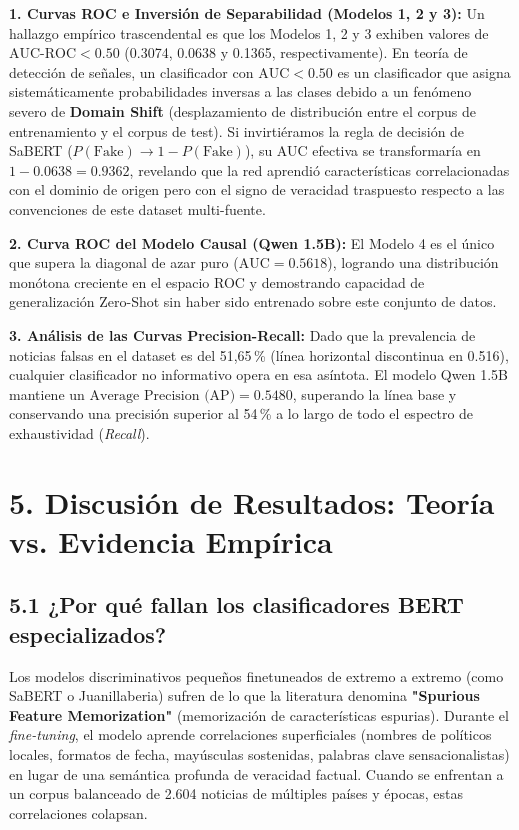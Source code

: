 \textbf{1. Curvas ROC e Inversión de Separabilidad (Modelos 1, 2 y 3):}
Un hallazgo empírico trascendental es que los Modelos 1, 2 y 3 exhiben valores de $\text{AUC-ROC} < 0.50$ (0.3074, 0.0638 y 0.1365, respectivamente). En teoría de detección de señales, un clasificador con $\text{AUC} < 0.50$ es un clasificador que asigna sistemáticamente probabilidades inversas a las clases debido a un fenómeno severo de \textbf{Domain Shift} (desplazamiento de distribución entre el corpus de entrenamiento y el corpus de test). Si invirtiéramos la regla de decisión de SaBERT ($P(\text{Fake}) \to 1 - P(\text{Fake})$), su AUC efectiva se transformaría en $1 - 0.0638 = 0.9362$, revelando que la red aprendió características correlacionadas con el dominio de origen pero con el signo de veracidad traspuesto respecto a las convenciones de este dataset multi-fuente.

\textbf{2. Curva ROC del Modelo Causal (Qwen 1.5B):}
El Modelo 4 es el único que supera la diagonal de azar puro ($\text{AUC} = 0.5618$), logrando una distribución monótona creciente en el espacio ROC y demostrando capacidad de generalización Zero-Shot sin haber sido entrenado sobre este conjunto de datos.

\textbf{3. Análisis de las Curvas Precision-Recall:}
Dado que la prevalencia de noticias falsas en el dataset es del 51,65\,\% (línea horizontal discontinua en 0.516), cualquier clasificador no informativo opera en esa asíntota. El modelo Qwen 1.5B mantiene un $\text{Average Precision (AP)} = 0.5480$, superando la línea base y conservando una precisión superior al 54\,\% a lo largo de todo el espectro de exhaustividad (\textit{Recall}).


\section*{5. Discusión de Resultados: Teoría vs. Evidencia Empírica}

\subsection*{5.1 ¿Por qué fallan los clasificadores BERT especializados?}

Los modelos discriminativos pequeños finetuneados de extremo a extremo (como SaBERT o Juanillaberia) sufren de lo que la literatura denomina \textbf{"Spurious Feature Memorization"} (memorización de características espurias). Durante el \textit{fine-tuning}, el modelo aprende correlaciones superficiales (nombres de políticos locales, formatos de fecha, mayúsculas sostenidas, palabras clave sensacionalistas) en lugar de una semántica profunda de veracidad factual. Cuando se enfrentan a un corpus balanceado de 2.604 noticias de múltiples países y épocas, estas correlaciones colapsan.

